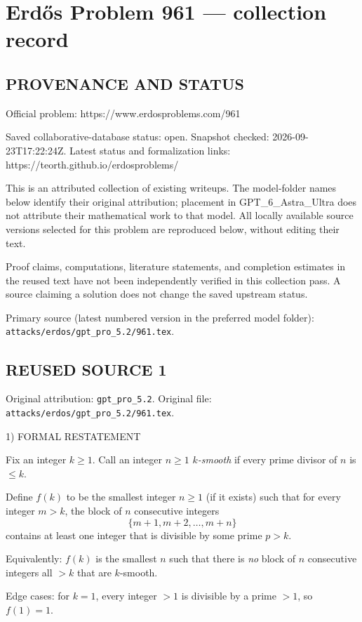 \section*{Erd\H{o}s Problem 961 --- collection record}

\subsection*{PROVENANCE AND STATUS}
Official problem: https://www.erdosproblems.com/961

Saved collaborative-database status: open.
Snapshot checked: 2026-09-23T17:22:24Z.
Latest status and formalization links: https://teorth.github.io/erdosproblems/

This is an attributed collection of existing writeups. The model-folder names below identify their original attribution; placement in GPT\_6\_Astra\_Ultra does not attribute their mathematical work to that model. All locally available source versions selected for this problem are reproduced below, without editing their text.

Proof claims, computations, literature statements, and completion estimates in the reused text have not been independently verified in this collection pass. A source claiming a solution does not change the saved upstream status.

Primary source (latest numbered version in the preferred model folder): \texttt{attacks/erdos/gpt\_pro\_5.2/961.tex}.

\subsection*{REUSED SOURCE 1}
Original attribution: \texttt{gpt\_pro\_5.2}.
Original file: \texttt{attacks/erdos/gpt\_pro\_5.2/961.tex}.


1) FORMAL RESTATEMENT

Fix an integer $k\ge 1$. Call an integer $n\ge 1$ \emph{$k$-smooth} if every prime divisor of $n$ is $\le k$.

Define $f(k)$ to be the smallest integer $n\ge 1$ (if it exists) such that for every integer $m>k$, the block of $n$ consecutive integers
\[
\{m+1,m+2,\dots,m+n\}
\]
contains at least one integer that is divisible by some prime $p>k$.

Equivalently: $f(k)$ is the smallest $n$ such that there is \emph{no} block of $n$ consecutive integers all $>k$ that are $k$-smooth.

Edge cases: for $k=1$, every integer $>1$ is divisible by a prime $>1$, so $f(1)=1$.

